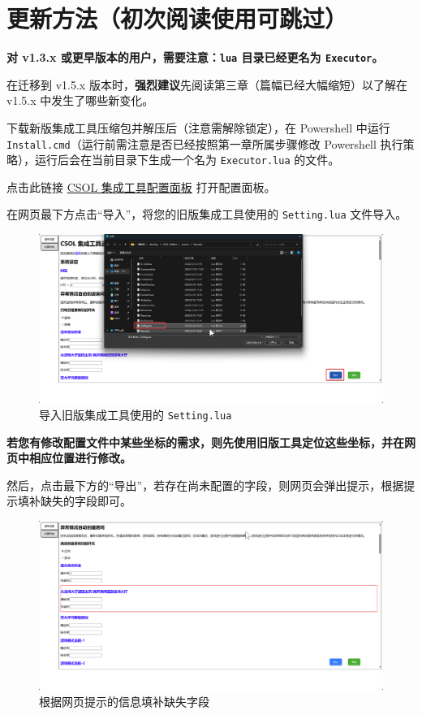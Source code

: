 \section{更新方法（初次阅读使用可跳过）}
\label{how_to_update}

\textbf{\color{red}对 v1.3.x 或更早版本的用户，需要注意：\lstinline{lua} 目录已经更名为 \lstinline{Executor}。}

在迁移到 v1.5.x 版本时，\textbf{\color{red}强烈建议}先阅读第三章（篇幅已经大幅缩短）以了解在 v1.5.x 中发生了哪些新变化。

下载新版集成工具压缩包并解压后（注意需解除锁定），在 Powershell 中运行 \lstinline{Install.cmd}（运行前需注意是否已经按照第一章所属步骤修改 Powershell 执行策略），运行后会在当前目录下生成一个名为 \lstinline{Executor.lua} 的文件。

点击此链接 \href{https://www.macrohard.fun/CSOL-Utilities/ConfigPanel}{CSOL 集成工具配置面板} 打开配置面板。

在网页最下方点击“导入”，将您的旧版集成工具使用的 \lstinline{Setting.lua} 文件导入。

\begin{figure}[H]
    \Centering
    \includegraphics[width=\textwidth]{assets/import_setting}
    \caption{导入旧版集成工具使用的 \lstinline{Setting.lua}}
\end{figure}

\textbf{\color{red}若您有修改配置文件中某些坐标的需求，则先使用旧版工具定位这些坐标，并在网页中相应位置进行修改。}

然后，点击最下方的“导出”，若存在尚未配置的字段，则网页会弹出提示，根据提示填补缺失的字段即可。

\begin{figure}[H]
    \Centering
    \includegraphics[width=\textwidth]{assets/export_error}
    \caption{根据网页提示的信息填补缺失字段}
\end{figure}

